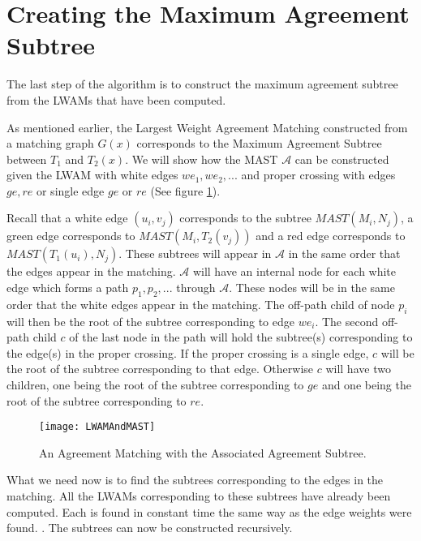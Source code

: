 \section{Creating the Maximum Agreement Subtree}
The last step of the algorithm is to construct the maximum agreement subtree from the LWAMs that have been computed.

As mentioned earlier, the Largest Weight Agreement Matching constructed from a matching graph $G(x)$ corresponds to the Maximum Agreement Subtree between $T_1$ and $T_2(x)$. We will show how the MAST $\mathcal{A}$ can be constructed given the LWAM with white edges ${we_1, we_2, ...}$ and proper crossing with edges ${ge, re}$ or single edge $ge$ or $re$ (See figure \ref{lwam_mast_figure}).

Recall that a white edge $(u_i, v_j)$ corresponds to the subtree $MAST(M_i,N_j)$, a green edge corresponds to $MAST(M_i,T_2(v_j))$ and a red edge corresponds to $MAST(T_1(u_i),N_j)$. These subtrees will appear in $\mathcal{A}$ in the same order that the edges appear in the matching. $\mathcal{A}$ will have an internal node for each white edge which forms a path ${p_1, p_2, ...}$ through $\mathcal{A}$. These nodes will be in the same order that the white edges appear in the matching. The off-path child of node $p_i$ will then be the root of the subtree corresponding to edge $we_i$. The second off-path child $c$ of the last node in the path will hold the subtree(s) corresponding to the edge(s) in the proper crossing. If the proper crossing is a single edge, $c$ will be the root of the subtree corresponding to that edge. Otherwise $c$ will have two children, one being the root of the subtree corresponding to $ge$ and one being the root of the subtree corresponding to $re$.

\begin{figure}
	\label{lwam_mast_figure}
	\texttt{[image: LWAMAndMAST]}
	\caption{An Agreement Matching with the Associated Agreement Subtree. \cite{nlogn}}
\end{figure}

What we need now is to find the subtrees corresponding to the edges in the matching. All the LWAMs corresponding to these subtrees have already been computed. Each is found in constant time the same way as the edge weights were found.  . The subtrees can now be constructed recursively.


